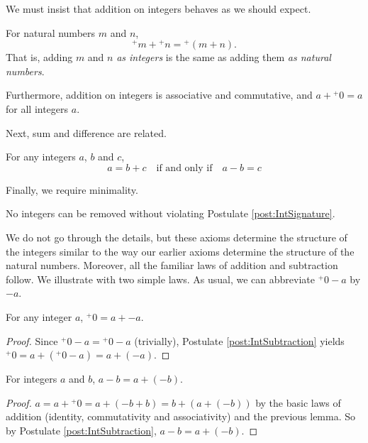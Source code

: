 We must insist that addition on integers behaves as we should expect. 
\begin{postulate}\label{post:IntAddition}
For natural numbers $m$ and $n$,
\[{}^+m + {}^+n = {}^+(m+n).\]
That is, adding $m$ and $n$ \emph{as integers} is the same as adding them \emph{as natural numbers}.

Furthermore, addition on integers is associative and commutative, and $a + {}^+0 = a$ for all integers $a$.
\end{postulate}

Next, sum and difference are related.

\begin{postulate}\label{post:IntSubtraction}
For any integers $a$, $b$ and $c$, 
\[a = b + c\quad\text{if and only if}\quad a - b = c\]
\end{postulate}

Finally, we require minimality.

\begin{postulate}\label{post:IntInduction}
  No integers can be removed without violating Postulate \ref{post:IntSignature}.
\end{postulate}

We do not go through the details, but these axioms determine the structure of the integers similar to the way our earlier axioms determine the structure of the natural numbers. 
Moreover, all the familiar laws of addition and subtraction follow.
We illustrate with two simple laws. 
As usual, we can abbreviate ${}^+0-a$ by $-a$.

\begin{lem}\label{lem:IntAdditiveInverse}
For any integer $a$, ${}^+0= a + -a$.

\begin{proof}
  Since ${}^+0-a = {}^+0-a$ (trivially), Postulate \ref{post:IntSubtraction} yields ${}^+0 = a + ({}^+0-a) = a + (-a)$.
\end{proof}
\end{lem}

\begin{lem}\label{lem:IntAddSub}
  For integers $a$ and $b$, $a-b = a + (-b)$.

  \begin{proof}
    $a = a + {}^+0 = a + (-b + b) = b + (a+(-b))$ by the basic laws of addition (identity, commutativity and associativity)
and the previous lemma. So by Postulate \ref{post:IntSubtraction}, $a-b = a + (-b)$.
  \end{proof}
\end{lem}

